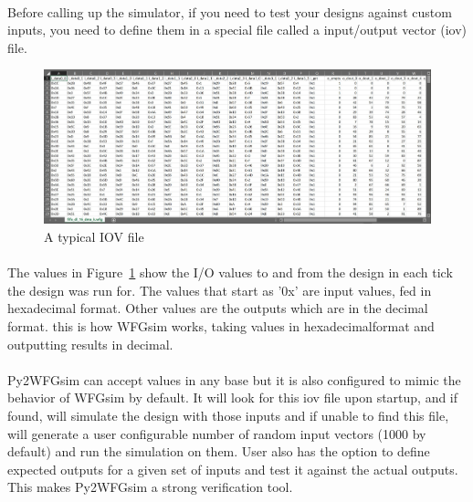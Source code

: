 \paragraph{}
Before calling up the simulator, if you need to test your designs against custom inputs, you need to define them in a special file called a input/output vector (iov) file.

\begin{figure}[h]
    \centering
    \includegraphics[trim=0cm 0cm 0cm 0cm, clip=true,scale=0.4]{figures/iov.jpg}
    \caption{A typical IOV file\label{Fig:iov}}\vspace{-4mm}
    \end{figure}

\paragraph{}
The values in Figure~\ref{Fig:iov} show the I/O values to and from the design in each tick the design was run for. The values that start as '0x' are input values, fed in hexadecimal format. Other values are the outputs which are in the decimal format. this is how WFGsim works, taking values in hexadecimalformat and outputting results in decimal. 

\paragraph{}
Py2WFGsim can accept values in any base but it is also configured to mimic the behavior of WFGsim by default. It will look for this iov file upon startup, and if found, will simulate the design with those inputs and if unable to find this file, will generate a user configurable number of random input vectors (1000 by default) and run the simulation on them. User also has the option to define expected outputs for a given set of inputs and test it against the actual outputs. This makes Py2WFGsim a strong verification tool.

